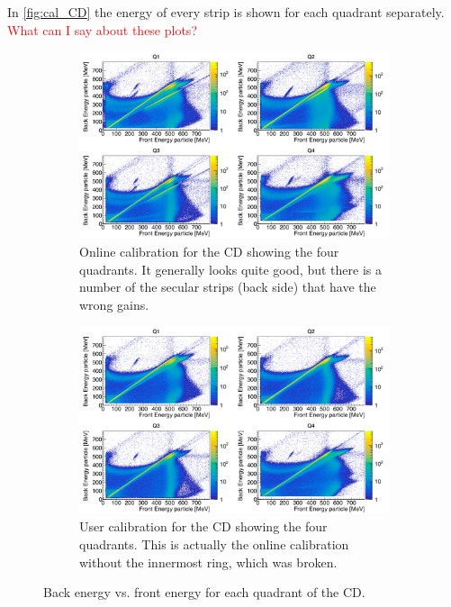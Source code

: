 \documentclass[twoside,english]{uiofysmaster/uiofysmaster}
\let\orgautoref\autoref
\renewcommand{\autoref}
        {%
		 \def\subsectionautorefname{Section}%
		 \def\subsubsectionautorefname{Section}%
          \orgautoref}
\begin{document}
In \autoref{fig:cal_CD} the energy of every strip is shown for each quadrant separately. \textcolor{red}{What can I say about these plots?}

\begin{figure}[ht]
	\centering
	\begin{subfigure}{\textwidth}
		\centering
		\includegraphics[width=\textwidth]{../Plots/plotting/E_f_b_Q1-4-online.png}
		\caption{Online calibration for the CD showing the four quadrants. It generally looks quite good, but there is a number of the secular strips (back side) that have the wrong gains.}
		\label{fig:cal_online}
	\end{subfigure}
	\begin{subfigure}{\textwidth}
		\centering
		\includegraphics[width=\textwidth]{../Plots/plotting/E_f_b_Q1-4-user.png}
		\caption{User calibration for the CD showing the four quadrants. This is actually the online calibration without the innermost ring, which was broken.}
		\label{fig:cal_user}
	\end{subfigure}
	\caption{Back energy vs. front energy for each quadrant of the CD.}
	\label{fig:cal_OU}
\end{figure}
\end{document}
